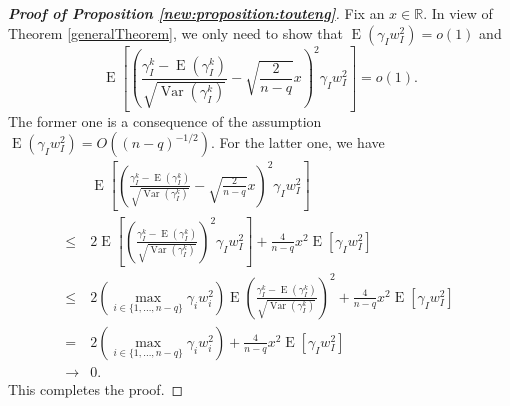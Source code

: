 \documentclass[smallextended]{svjour3}       %
\DeclareMathOperator{\myE}{E}
\DeclareMathOperator{\myVar}{Var}
\begin{document}
\begin{proof}[\textbf{Proof of Proposition \ref{new:proposition:touteng}}]
    Fix an $x\in \mathbb R$.
    In view of Theorem \ref{generalTheorem}, we only need to show that $\myE(\gamma_I w_I^2) = o(1)$ and 
\begin{equation*}%
     \myE\left[ 
         \left( \frac{\gamma_I^k -\myE(\gamma_I^k)}{\sqrt{\myVar\left( \gamma_I^k \right)}} -\sqrt{\frac{2}{n-q}}x \right)^2
        \gamma_I w_I^2
    \right] = o(1).
\end{equation*}
The former one is a consequence of the assumption $\myE(\gamma_I w_I^2) = O((n-q)^{-1/2})$.
For the latter one, we have
\begin{align*}
    &
     \myE\left[ 
         \left( \frac{\gamma_I^k -\myE(\gamma_I^k)}{\sqrt{\myVar\left( \gamma_I^k \right)}} -\sqrt{\frac{2}{n-q}}x \right)^2
        \gamma_I w_I^2
    \right]
    \\
    \leq
    &
         2 \myE 
         \left[
         \left( \frac{\gamma_I^k -\myE(\gamma_I^k)}{\sqrt{\myVar\left( \gamma_I^k \right)}} \right)^2
        \gamma_I w_I^2
\right]
        +
{\frac{4}{n-q}} x^2
\myE \left[ \gamma_I w_I^2 \right]
    \\
    \leq
    &
         2
     \left(\max_{i\in\{1,\dots,n-q\}}\gamma_i w_i^2\right)
         \myE 
         \left( \frac{\gamma_I^k -\myE(\gamma_I^k)}{\sqrt{\myVar\left( \gamma_I^k \right)}} \right)^2
        +
{\frac{4}{n-q}} x^2
\myE \left[ \gamma_I w_I^2 \right]
    \\
    =
    &
         2
     \left(\max_{i\in\{1,\dots,n-q\}}\gamma_i w_i^2\right)
        +
{\frac{4}{n-q}} x^2
\myE \left[ \gamma_I w_I^2 \right]
    \\
    \to & 0.    
\end{align*}
This completes the proof.
\end{proof}


 










\end{document}
